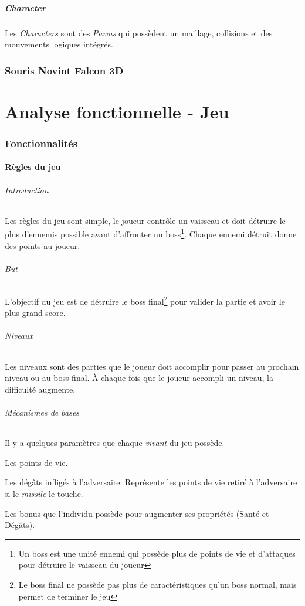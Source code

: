 \documentclass[11pt, a4paper, oneside]{article}
\begin{document}
\subsubsection{Character}
Les \emph{Characters} sont des \emph{Pawns} qui possèdent un maillage, collisions et des mouvements logiques intégrés.

\section{Souris Novint Falcon 3D}
\newpage
\part{Analyse fonctionnelle - Jeu}
\section{Fonctionnalités}
\subsection{Règles du jeu}
\paragraph{Introduction}
Les règles du jeu sont simple, le joueur contrôle un vaisseau et doit détruire le plus d'ennemis possible avant d'affronter un boss\footnote{Un boss est une unité ennemi qui possède plus de points de vie et d'attaques pour détruire le vaisseau du joueur}. Chaque ennemi détruit donne des points au joueur.
\paragraph{But}
L'objectif du jeu est de détruire le boss final\footnote{Le boss final ne possède pas plus de caractéristiques qu'un boss normal, mais permet de terminer le jeu} pour valider la partie et avoir le plus grand score.
\paragraph{Niveaux}
Les niveaux sont des parties que le joueur doit accomplir pour passer au prochain niveau ou au boss final. À chaque fois que le joueur accompli un niveau, la difficulté augmente.
\paragraph{Mécanismes de bases}
Il y a quelques paramètres que chaque \emph{vivant} du jeu possède.
\begin{description}
\setlength{\itemindent}{-.cm}
	\item[— Santé] Les points de vie.
	\item[— Dégâts] Les dégâts infligés à l'adversaire. Représente les points de vie retiré à l'adversaire si le \emph{missile} le touche.
	\item[— Bonus] Les bonus que l'individu possède pour augmenter ses propriétés (Santé et Dégâts).
\end{description}
\end{document}
